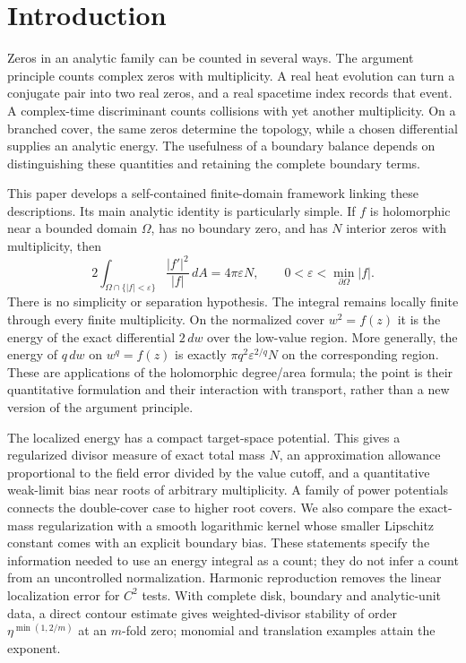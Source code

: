 \section{Introduction}
\label{intro:section}

Zeros in an analytic family can be counted in several ways. The argument
principle counts complex zeros with multiplicity. A real heat evolution
can turn a conjugate pair into two real zeros, and a real spacetime index
records that event. A complex-time discriminant counts collisions with
yet another multiplicity. On a branched cover, the same zeros determine
the topology, while a chosen differential supplies an analytic energy.
The usefulness of a boundary balance depends on distinguishing these
quantities and retaining the complete boundary terms.

This paper develops a self-contained finite-domain framework linking
these descriptions. Its main analytic identity is particularly simple.
If $f$ is holomorphic near a bounded domain $\Omega$, has no boundary
zero, and has $N$ interior zeros with multiplicity, then
\begin{equation}\label{intro:main}
 2\int_{\Omega\cap\{|f|<\varepsilon\}}
       \frac{|f'|^2}{|f|}\,dA=4\pi\varepsilon N,
 \qquad0<\varepsilon<\min_{\partial\Omega}|f|.
\end{equation}
There is no simplicity or separation hypothesis. The integral remains
locally finite through every finite multiplicity. On the normalized
cover $w^2=f(z)$ it is the energy of the exact differential $2\,dw$
over the low-value region. More generally, the energy of $q\,dw$ on
$w^q=f(z)$ is exactly $\pi q^2\varepsilon^{2/q}N$ on the corresponding
region. These are applications of the holomorphic degree/area formula;
the point is their quantitative formulation and their interaction with
transport, rather than a new version of the argument principle.

The localized energy has a compact target-space potential. This gives a
regularized divisor measure of exact total mass $N$, an approximation
allowance proportional to the field error divided by the value cutoff,
and a quantitative weak-limit bias near roots of arbitrary multiplicity.
A family of power potentials connects the double-cover case to higher
root covers. We also compare the exact-mass regularization with a smooth
logarithmic kernel whose smaller Lipschitz constant comes with an
explicit boundary bias. These statements specify the information needed
to use an energy integral as a count; they do not infer a count from an
uncontrolled normalization. Harmonic reproduction removes the linear
localization error for $C^2$ tests. With complete disk, boundary and
analytic-unit data, a direct contour estimate gives weighted-divisor
stability of order $\eta^{\min(1,2/m)}$ at an $m$-fold zero;
monomial and translation examples attain the exponent.

